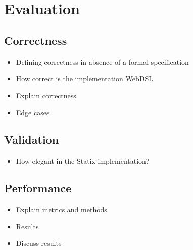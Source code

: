 
\chapter{\label{chap:evaluation}Evaluation}

\section{\label{sec:correctness}Correctness}

  \begin{itemize}
    \item Defining correctness in absence of a formal specification
    \item How correct is the implementation WebDSL
    \item Explain correctness
    \item Edge cases
  \end{itemize}

\section{\label{sec:validation}Validation}

  \begin{itemize}
    \item How elegant in the Statix implementation?
  \end{itemize}

\section{\label{sec:performance}Performance}

  \begin{itemize}
    \item Explain metrics and methods
    \item Results
    \item Discuss results
  \end{itemize}
